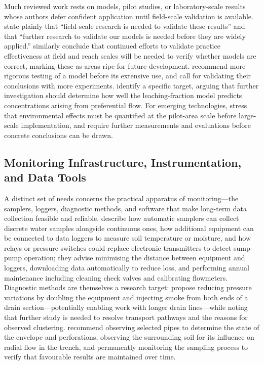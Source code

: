 \documentclass[11pt]{article}
\begin{document}
Much reviewed work rests on models, pilot studies, or laboratory-scale results whose authors defer confident application until field-scale validation is available. \textcite{Mitchell2025} state plainly that ``field-scale research is needed to validate these results'' and that ``further research to validate our models is needed before they are widely applied.'' \textcite{Kalcic2018} similarly conclude that continued efforts to validate practice effectiveness at field and reach scales will be needed to verify whether models are correct, marking these as areas ripe for future development. \textcite{Garmdareh2018} recommend more rigorous testing of a model before its extensive use, and \textcite{Yu2016} call for validating their conclusions with more experiments. \textcite{SHALIT1995} identify a specific target, arguing that further investigation should determine how well the leaching-fraction model predicts concentrations arising from preferential flow. For emerging technologies, \textcite{DarziNaftchali2018b} stress that environmental effects must be quantified at the pilot-area scale before large-scale implementation, and \textcite{GUPTA1993} require further measurements and evaluations before concrete conclusions can be drawn.

\subsection{Monitoring Infrastructure, Instrumentation, and Data Tools}

A distinct set of needs concerns the practical apparatus of monitoring---the samplers, loggers, diagnostic methods, and software that make long-term data collection feasible and reliable. \textcite{Kanwar1999} describe how automatic samplers can collect discrete water samples alongside continuous ones, how additional equipment can be connected to data loggers to measure soil temperature or moisture, and how relays or pressure switches could replace electronic transmitters to detect sump-pump operation; they advise minimising the distance between equipment and loggers, downloading data automatically to reduce loss, and performing annual maintenance including cleaning check valves and calibrating flowmeters. Diagnostic methods are themselves a research target: \textcite{Petersen2012} propose reducing pressure variations by doubling the equipment and injecting smoke from both ends of a drain section---potentially enabling work with longer drain lines---while noting that further study is needed to resolve transport pathways and the reasons for observed clustering. \textcite{MartínezBeltrán2007} recommend observing selected pipes to determine the state of the envelope and perforations, observing the surrounding soil for its influence on radial flow in the trench, and permanently monitoring the sampling process to verify that favourable results are maintained over time.
\end{document}

